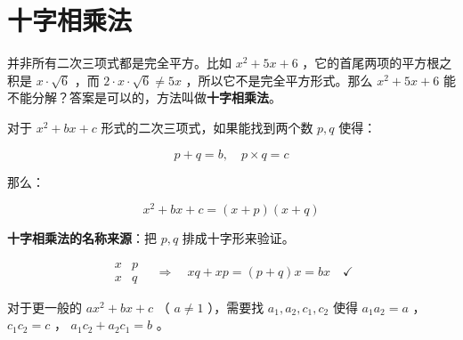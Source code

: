 \section*{十字相乘法}


\begin{explore}


并非所有二次三项式都是完全平方。比如 $x^2 + 5x + 6$ ，它的首尾两项的平方根之积是 $x \cdot \sqrt{6}$ ，而 $2 \cdot x \cdot \sqrt{6} \neq 5x$ ，所以它不是完全平方形式。那么 $x^2 + 5x + 6$ 能不能分解？答案是可以的，方法叫做\textbf{十字相乘法}。

\end{explore}

\begin{understand}


对于 $x^2 + bx + c$ 形式的二次三项式，如果能找到两个数 $p, q$ 使得：

\[
p + q = b, \quad p \times q = c
\]


那么：

\[
x^2 + bx + c = (x + p)(x + q)
\]


\textbf{十字相乘法的名称来源}：把 $p, q$ 排成十字形来验证。

\[
\begin{array}{cc}
x & p \\
x & q
\end{array}
\quad \Rightarrow \quad xq + xp = (p+q)x = bx \quad \checkmark
\]


对于更一般的 $ax^2 + bx + c$ （ $a \neq 1$ ），需要找 $a_1, a_2, c_1, c_2$ 使得 $a_1 a_2 = a$ ， $c_1 c_2 = c$ ， $a_1 c_2 + a_2 c_1 = b$ 。

\end{understand}


